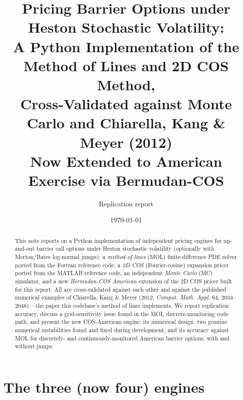 \documentclass[11pt]{article}
\title{Pricing Barrier Options under Heston Stochastic Volatility:\\
A Python Implementation of the Method of Lines and 2D COS Method,\\
Cross-Validated against Monte Carlo and Chiarella, Kang \& Meyer (2012)\\[0.3em]
\large Now Extended to American Exercise via Bermudan-COS}
\author{Replication report}
\date{\today}
\begin{document}
\maketitle

\begin{abstract}
This note reports on a Python implementation of independent pricing engines
for up-and-out barrier call options under Heston stochastic volatility
(optionally with Merton/Bates log-normal jumps): a \emph{method-of-lines}
(MOL) finite-difference PDE solver ported from the Fortran reference code, a
\emph{2D COS} (Fourier-cosine) expansion pricer ported from the MATLAB
reference code, an independent \emph{Monte Carlo} (MC) simulator, and a new
\emph{Bermudan-COS American} extension of the 2D COS pricer built for this
report. All are cross-validated against each other and against the published
numerical examples of Chiarella, Kang \& Meyer (2012, \emph{Comput. Math.
Appl.} 64, 2034--2048) -- the paper this codebase's method of lines
implements. We report replication accuracy, discuss a grid-sensitivity issue
found in the MOL discrete-monitoring code path, and present the new
COS-American engine: its numerical design, two genuine numerical
instabilities found and fixed during development, and its accuracy against
MOL for discretely- and continuously-monitored American barrier options,
with and without jumps.
\end{abstract}

\setcounter{table}{1}

\section{The three (now four) engines}
\end{document}
